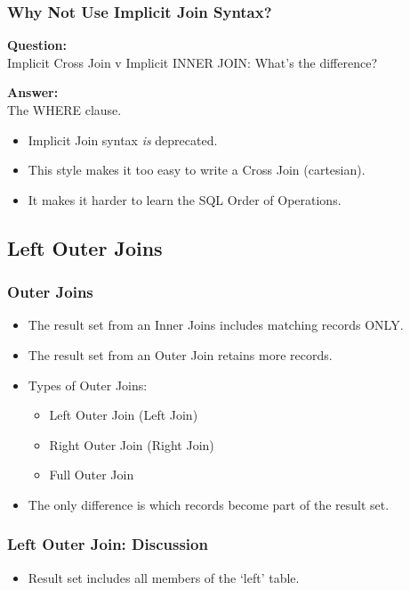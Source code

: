\documentclass{beamer}
\begin{document}
\begin{frame} %
  \frametitle{Why Not Use Implicit Join Syntax?}

  \textbf{Question:}\\ Implicit Cross Join v Implicit INNER JOIN: What's the difference?
  
  \bigskip
  \pause
  \textbf{Answer:}\\ The WHERE clause.
  
  \bigskip
  \begin{itemize}
  \item Implicit Join syntax \emph{is} deprecated.
  \item This style makes it too easy to write a Cross Join (cartesian).
  \item It makes it harder to learn the SQL Order of Operations.
  \end{itemize}

  
\end{frame}



\subsection{Left Outer Joins} %

\begin{frame} %
  \frametitle{Outer Joins}
  \begin{itemize}
  \item The result set from an Inner Joins includes matching records ONLY.
  \item The result set from an Outer Join retains more records.
  \item Types of Outer Joins:
    \begin{itemize}
    \item Left Outer Join (Left Join)
    \item Right Outer Join (Right Join)
    \item Full Outer Join
    \end{itemize}
  \item The only difference is which records become part of the result
    set.
  \end{itemize}
\end{frame}

\begin{frame} %
  \frametitle{Left Outer Join: Discussion}
  \begin{itemize}
  \item Result set includes all members of the `left' table.
  \end{itemize}
\end{frame}
\end{document}
